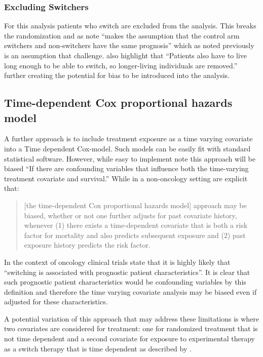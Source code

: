 \subsubsection{Excluding Switchers}
For this analysis patients who switch are excluded from the analysis. This breaks the randomization and as \cite{Watkins2013} note ``makes the assumption that the control arm switchers and non-switchers have the same prognosis'' which as noted previously is an assumption that \cite{TSD16} challenge. \cite{Watkins2013} also highlight that ``Patients also have to live long enough to be able to switch, so longer-living individuals are removed.'' further creating the potential for bias to be introduced into the analysis.

\subsection{Time-dependent Cox proportional hazards model}

A further approach is to include treatment exposure as a time varying covariate into a Time dependent Cox-model. Such models can be easily fit with standard statistical software. However, while easy to implement \cite{Watkins2013} note this approach will be biased ``If there are confounding variables that influence both the time-varying treatment covariate and survival.'' While in a non-oncology setting \cite{Hernan2000} are explicit that:
\begin{quote}
[the time-dependent Cox proportional hazards model] approach may be biased, whether or not one further adjusts for past covariate history, whenever (1) there exists a time-dependent covariate that is both a risk factor for mortality and also predicts subsequent exposure and (2) past exposure history predicts the risk factor.
\end{quote}
In the context of oncology clinical trials \cite{TSD16} state that it is highly likely that ``switching is associated with prognostic patient characteristics''. It is clear that such prognostic patient characteristics would be confounding variables by this definition and therefore the time varying covariate analysis may be biased even if adjusted for these characteristics.

A potential variation of this approach that may address these limitations is where two covariates are considered for treatment: one for randomized treatment that is not time dependent and a second covariate for exposure to experimental therapy as a switch therapy that is time dependent as described by \cite{Leon2014}. 

